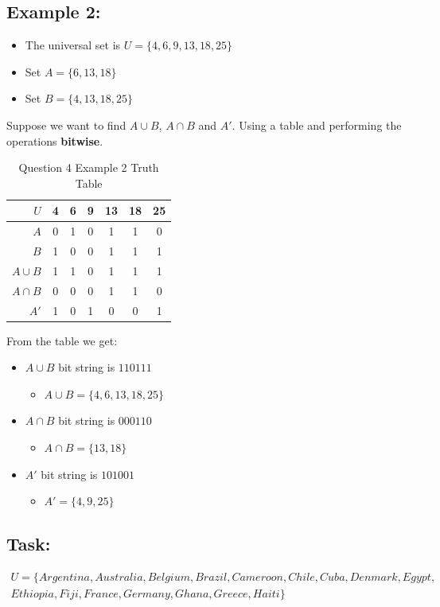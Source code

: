 \documentclass[12pt,a4paper]{article}
\begin{document}
\subsection{Example 2:}

\begin{itemize}
\item The universal set is $U = \{4, 6, 9, 13, 18, 25\}$
\item Set $A = \{6, 13, 18\}$
\item Set $B = \{4, 13, 18, 25\}$
\end{itemize}
Suppose we want to find $A \cup B$, $A \cap B$ and $A'$. Using a table and performing the operations \textbf{bitwise}.

\begin{table}[h]
\centering
\caption{Question 4 Example 2 Truth Table}
\begin{tabular}{r|c|c|c|c|c|c}
$U$ & 4 & 6 & 9 & 13 & 18 & 25 \\
\hline
$A$ & 0 & 1 & 0 & 1 & 1 & 0 \\
\hline
$B$ & 1 & 0 & 0 & 1 & 1 & 1 \\
\hline
$A \cup B$ & 1 & 1 & 0 & 1 & 1 & 1 \\
\hline
$A \cap B$ & 0 & 0 & 0 & 1 & 1 & 0 \\
\hline
$A'$ & 1 & 0 & 1 & 0 & 0 & 1 \\
\hline
\end{tabular}
\end{table}
From the table we get:
\begin{itemize}
\item $A \cup B$ bit string is $110111$
	\begin{itemize}
	\item $A \cup B = \{4, 6, 13, 18, 25\}$
	\end{itemize}
\item $A \cap B$ bit string is $000110$
	\begin{itemize}
	\item $A \cap B = \{13, 18\}$
	\end{itemize}
\item $A'$ bit string is $101001$
	\begin{itemize}
	\item $A' = \{4, 9, 25\}$
	\end{itemize}
\end{itemize}

\subsection{Task:}
\begin{gather*}
U = \{Argentina, Australia, Belgium, Brazil, Cameroon, Chile, Cuba, Denmark, Egypt, 
\\Ethiopia, Fiji, France, Germany, Ghana, Greece, Haiti\}
\end{gather*}
\end{document}
